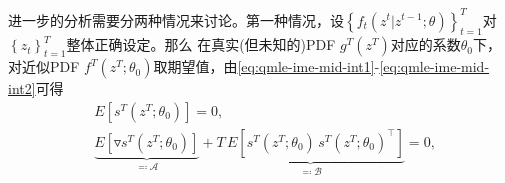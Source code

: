 进一步的分析需要分两种情况来讨论。第一种情况，设$\left\{ f_{t} \left(z^{t}|z^{t-1} ; \theta \right) \right\}_{t=1}^{T}$对$\left\{ z_{t} \right\}_{t=1}^{T}$整体正确设定。那么
在真实(但未知的)PDF $g^{T} \left(z^{T} \right)$对应的系数$\theta_{0}$下，对近似PDF $f^{T} \left( z^{T} ; \theta_{0} \right)$取期望值，由\eqref{eq:qmle-ime-mid-int1}-\eqref{eq:qmle-ime-mid-int2}可得
\begin{align}
    \label{eq:qmle-ime-mid-correct-int1}
    & E \left[ s^{T} \left( z^{T} ; \theta_{0} \right) \right]=0, \\
    \label{eq:qmle-ime-mid-correct-int2}
    & \underbrace{
    E \left[
    \triangledown s^{T} \left( z^{T} ; \theta_{0} \right)
    \right]
    }_{\eqqcolon \mathcal{A}}
     + \underbrace{
     T \, E
    \left[
    s^{T} \left( z^{T}; \theta_{0} \right) \,
    s^{T} \left( z^{T}; \theta_{0} \right)^{\top}
    \right]
    }_{\eqqcolon \mathcal{B}}
     =0,
\end{align}

